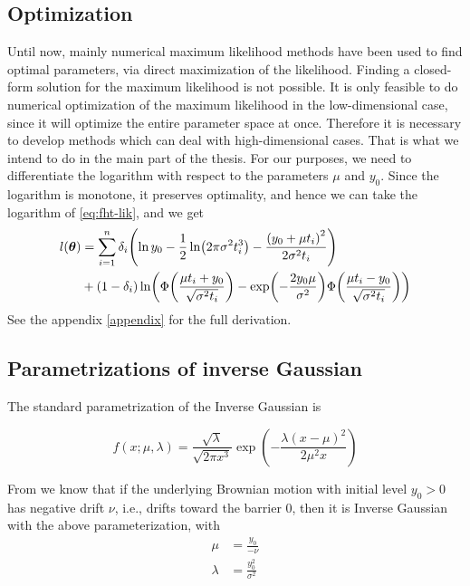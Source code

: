 \subsection{Optimization}
Until now, mainly numerical maximum likelihood methods have been used to find optimal parameters, via direct maximization of the likelihood. Finding a closed-form solution for the maximum likelihood is not possible. It is only feasible to do numerical optimization of the maximum likelihood in the low-dimensional case, since it will optimize the entire parameter space at once. Therefore it is necessary to develop methods which can deal with high-dimensional cases. That is what we intend to do in the main part of the thesis. For our purposes, we need to differentiate the logarithm with respect to the parameters $\mu$ and $y_0$. Since the logarithm is monotone, it preserves optimality, and hence we can take the logarithm of \eqref{eq:fht-lik}, and we get
\begin{align}\label{eq:loglik}
\begin{split}
    l(\btheta)&=\sum_{i=1}^n\di\p*{\ln y_0-\frac{1}{2}\ln\p*{2\pi\sigma^2\ti^3}-\frac{\p*{y_0+\mu\ti}^2}{2\sigma^2\ti}} \\
    &+
    (1-\di)\ln\p*{\Phi\p*{\frac{\mu\ti+y_0}{\sqrt{\sigma^2\ti}}}-\exp\p*{-\frac{2y_0\mu}{\sigma^2}}\Phi\p*{\frac{\mu\ti-y_0}{\sqrt{\sigma^2\ti}}}}
\end{split}
\end{align}
See the appendix \ref{appendix} for the full derivation.



\subsection{Parametrizations of inverse Gaussian}
The standard parametrization of the Inverse Gaussian is

\begin{equation*}
    f(x;\mu,\lambda)=
    \frac{\sqrt{\lambda}}{\sqrt{2\pi x^3}}\exp\left(-\frac{\lambda(x-\mu)^2}{2\mu^2x}\right)
\end{equation*}

From \citet{chhikara1988} we know that if the underlying Brownian motion with initial level $y_0>0$ has negative drift $\nu$, i.e., drifts toward the barrier 0, then it is Inverse Gaussian with the above parameterization, with
\begin{align*}
    \mu&=\frac{y_0}{-\nu} \\
    \lambda&=\frac{y_0^2}{\sigma^2}
\end{align*}



